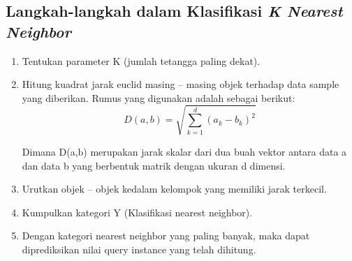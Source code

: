 \subsection{Langkah-langkah dalam Klasifikasi \textit{K Nearest Neighbor}}
\begin{enumerate}
    \item Tentukan parameter K (jumlah tetangga paling dekat).
    \item Hitung kuadrat jarak euclid masing – masing objek terhadap data sample yang
diberikan. Rumus yang digunakan adalah sebagai berikut:
    \begin{equation}
        D(a,b)= \sqrt{\sum_{k=1}^{d}(a_{k}-b_{k})^{2}}
        \label{rumusknn1}
    \end{equation}
    \par Dimana D(a,b) merupakan jarak skalar dari dua buah vektor antara data a dan data b yang berbentuk matrik dengan ukuran d dimensi.
    \item Urutkan objek – objek kedalam kelompok yang memiliki jarak terkecil.
    \item Kumpulkan kategori Y (Klasifikasi nearest neighbor).
    \item Dengan kategori nearest neighbor yang paling banyak, maka dapat diprediksikan
nilai query instance yang telah dihitung\cite{zainuddin2019implementasi}.
\end{enumerate}

